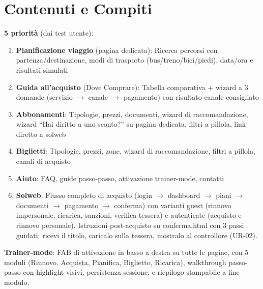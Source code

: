 ﻿\documentclass[11pt,a4paper]{article}
\begin{document}
\section{Contenuti e Compiti}

\begin{tcolorbox}[rffield]
\small
\textbf{5 priorit\`a} (dai test utente):

\begin{enumerate}[nosep,leftmargin=*]
  \item \textbf{Pianificazione viaggio} (pagina dedicata): Ricerca percorsi con partenza/destinazione, modi di trasporto (bus/treno/bici/piedi), data/ora e risultati simulati
  \item \textbf{Guida all'acquisto} (Dove Comprare): Tabella comparativa + wizard a 3 domande (servizio $\rightarrow$ canale $\rightarrow$ pagamento) con risultato canale consigliato
  \item \textbf{Abbonamenti}: Tipologie, prezzi, documenti, wizard di raccomandazione, wizard ``Hai diritto a uno sconto?'' su pagina dedicata, filtri a pillola, link diretto a solweb
  \item \textbf{Biglietti}: Tipologie, prezzi, zone, wizard di raccomandazione, filtri a pillola, canali di acquisto
  \item \textbf{Aiuto}: FAQ, guide passo-passo, attivazione trainer-mode, contatti
  \item \textbf{Solweb}: Flusso completo di acquisto (login $\rightarrow$ dashboard $\rightarrow$ piani $\rightarrow$ documenti $\rightarrow$ pagamento $\rightarrow$ conferma) con varianti guest (rinnovo impersonale, ricarica, sanzioni, verifica tessera) e autenticate (acquisto e rinnovo personale). Istruzioni post-acquisto su conferma.html con 3 passi guidati: ricevi il titolo, caricalo sulla tessera, mostralo al controllore (UR-02).
\end{enumerate}

\noindent\textbf{Trainer-mode}: FAB di attivazione in basso a destra su tutte le pagine, con 5 moduli (Rinnovo, Acquista, Pianifica, Biglietto, Ricarica), walkthrough passo-passo con highlight visivi, persistenza sessione, e riepilogo stampabile a fine modulo.
\end{tcolorbox}

\end{document}
